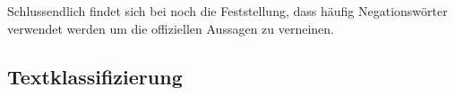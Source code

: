 Schlussendlich findet sich bei \textcite[149]{stumpf_2019} noch die Feststellung, dass häufig Negationswörter verwendet werden um die offiziellen Aussagen zu verneinen.



\subsection{Textklassifizierung}

